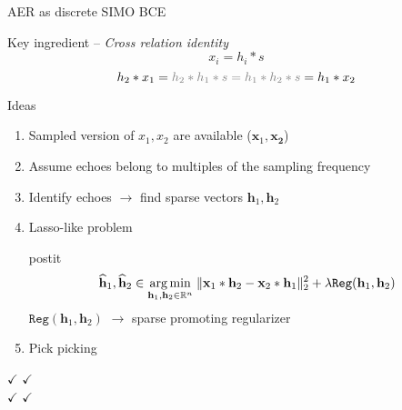 \begin{frame}{AER as discrete SIMO BCE}


    \begin{block}{Key ingredient -- \textit{Cross relation identity}}
    \[
        x_i = h_i \ast s
    \]
    \[
        h_2 \ast x_1 = \textcolor{gray}{h_2 \ast h_1 \ast s  = h_1 \ast h_2 \ast s} = h_1 \ast x_2
    \]
    \end{block}

    \vspace*{-1em}

   \begin{block}{Ideas}
   \begin{enumerate}
       \item Sampled version of $x_1,x_2$ are available ($\mathbf{x}_1, \mathbf{x_2}$)
       \item Assume echoes belong to multiples of the sampling frequency
       \item Identify echoes $\rightarrow$ find sparse vectors $\mathbf{h}_1, \mathbf{h}_2$
       \item Lasso-like problem

       \vspace*{.25em}


        \begin{beamercolorbox}[sep=.5em, wd=10cm]{postit}
            \begin{equation*}
                \widehat{\mathbf{h}}_1, \widehat{\mathbf{h}}_2 \in
                \underset{\mathbf{h}_1, \mathbf{h}_2\in\kR^n}{\arg\min}\;
                \Vert \mathbf{x}_1 \ast \mathbf{h}_2 - \mathbf{x}_2 \ast \mathbf{h}_1 \Vert_2^2
                + \lambda \texttt{Reg}(\mathbf{h}_1, \mathbf{h}_2)
            \end{equation*}
            \hfill {\footnotesize $\texttt{Reg}(\mathbf{h}_1, \mathbf{h}_2)$ $\longrightarrow$ sparse promoting regularizer}
        \end{beamercolorbox}
   \item Pick picking
   \end{enumerate}

   \begin{center}
       \textcolor{mygreen}{$\checkmark$}  \cite{Lin2007} \qquad \textcolor{mygreen}{$\checkmark$} \cite{Aissa-El-Bey2008} \\
       \textcolor{mygreen}{$\checkmark$} \cite{Kowalczyk2013} \qquad \textcolor{mygreen}{$\checkmark$} \cite{Crocco2015}
   \end{center}
   \end{block}
 \end{frame}

